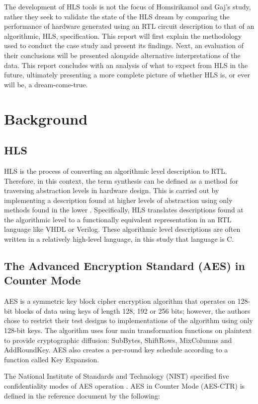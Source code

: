 \documentclass[12pt,journal,compsoc,onecolumn]{IEEEtran}
\begin{document}
The development of HLS tools is not the focus of Homsirikamol and Gaj's study, rather they seek to validate the state of the HLS dream by comparing the performance of hardware generated using an RTL circuit description to that of an algorithmic, HLS, specification. This report will first explain the methodology used to conduct the case study and present its findings. Next, an evaluation of their conclusions will be presented alongside alternative interpretations of the data. This report concludes with an analysis of what to expect from HLS in the future, ultimately presenting a more complete picture of whether HLS is, or ever will be, a dream-come-true.

\section{Background}
\subsection{HLS}\label{sec:hls}

HLS is the process of converting an algorithmic level description to RTL. Therefore, in this context, the term synthesis can be defined as a method for traversing abstraction levels in hardware design. This is carried out by implementing a description found at higher levels of abstraction using only methods found in the lower \cite{churtl}. Specifically, HLS translates descriptions found at the algorithmic level to a functionally equivalent representation in an RTL language like VHDL or Verilog. These algorithmic level descriptions are often written in a relatively high-level language, in this study that language is C. 

\subsection{The Advanced Encryption Standard (AES) in Counter Mode}

AES is a symmetric key block cipher encryption algorithm that operates on 128-bit blocks of data using keys of length 128, 192 or 256 bits; however, the authors chose to restrict their test designs to implementations of the algorithm using only 128-bit keys. The algorithm uses four main transformation functions on plaintext to provide cryptographic diffusion: SubBytes, ShiftRows, MixColumns and AddRoundKey. AES also creates a per-round key schedule according to a function called Key Expansion.

The National Institute of Standards and Technology (NIST) specified five confidentiality modes of AES operation \cite{14}. AES in Counter Mode (AES-CTR) is defined in the reference document by the following:
\end{document}
